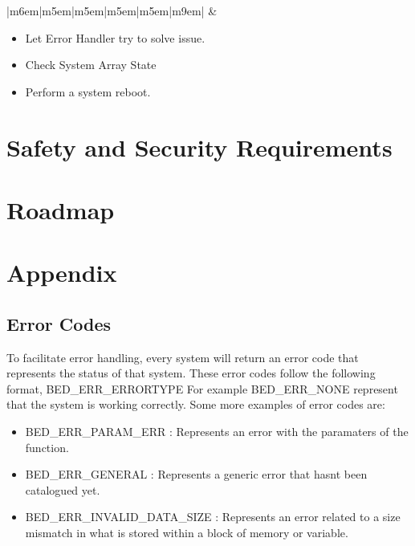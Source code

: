\documentclass{article}
\begin{document}
\begin{tabular}{|m{6em}|m{5em}|m{5em}|m{5em}|m{5em}|m{9em}|}
        & \begin{minipage}[t]{\linewidth}
              \begin{itemize}[nosep, wide=0pt, leftmargin=*, after=\strut]
	            \item Let Error Handler try to solve issue.
	            \item Check System Array State
		    \item Perform a system reboot.
               \end{itemize}
            \end{minipage}  \tabularnewline{}
\end{tabular}%









\section{Safety and Security Requirements}


\section{Roadmap}


\section{Appendix}
\subsection{Error Codes}
To facilitate error handling, every system will return an error code that represents the status of that system. These error codes follow the following format, BED\_ERR\_ERRORTYPE
For example BED\_ERR\_NONE represent that the system is working correctly. Some more examples of error codes are:
\begin{itemize}
\item BED\_ERR\_PARAM\_ERR		 	: Represents an error with the paramaters of the function.
\item BED\_ERR\_GENERAL			 	: Represents a generic error that hasnt been catalogued yet. 	
\item BED\_ERR\_INVALID\_DATA\_SIZE	: Represents an error related to a size mismatch in what is stored within a block of memory or variable.
\end{itemize}
\end{document}
